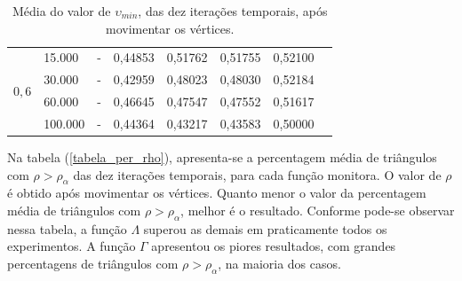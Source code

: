 \begin{table}[!ht]
\begin{center}
\begin{tabular}{|l|l|l|l|l|l|l|l|}
\hline %
\multirow{4}{*}{$0,6$}
& 15.000 & - & 0,44853 & 0,51762 & 0,51755 & 0,52100 \\
& 30.000 & - & 0,42959 & 0,48023 & 0,48030 & 0,52184 \\
& 60.000 & - & 0,46645 & 0,47547 & 0,47552 & 0,51617 \\
& 100.000 & - & 0,44364 & 0,43217 & 0,43583 & 0,50000 \\
\hline %
\end{tabular}%
\end{center}
\caption{Média do valor de $\upsilon_{min}$, das dez iterações temporais, após movimentar os vértices.} %
\label{tabela_upsilon}
\end{table}

Na tabela (\ref{tabela_per_rho}), apresenta-se a percentagem média de triângulos com $\rho > \rho_{\alpha}$ das dez iterações temporais, para cada função monitora. O valor de $\rho$ é obtido após movimentar os vértices. Quanto menor o valor da percentagem média de triângulos com $\rho > \rho_{\alpha}$, melhor é o resultado. Conforme pode-se observar nessa tabela, a função $\Lambda$ superou as demais em praticamente todos os experimentos. A função $\Gamma$ apresentou os piores resultados, com grandes percentagens de triângulos com $\rho > \rho_{\alpha}$, na maioria dos casos.

